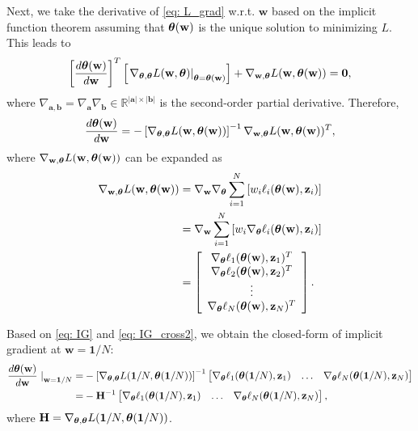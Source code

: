 Next, we take the derivative of  \eqref{eq: L_grad} w.r.t. $\mathbf w$ based on   the implicit function theorem \cite{gould2016differentiating} assuming that $\boldsymbol{\theta}(\mathbf w)$ is the  unique solution  to minimizing $L$. This leads to
\begin{equation}
     \left[\frac{d \boldsymbol{\theta}(\mathbf w)}{d \mathbf w}\right]^T \left[\left.\nabla_{\boldsymbol{\theta}, \boldsymbol{\theta}} L(\mathbf w, \boldsymbol{\theta})\right|_{\boldsymbol{\theta} = \boldsymbol{\theta}(\mathbf w)} \right] +  \nabla_{\mathbf w, \boldsymbol{\theta}}L(\mathbf w, \boldsymbol{\theta}(\mathbf w)) = \mathbf 0,
\end{equation}
where $\nabla_{\mathbf a, \mathbf b} = \nabla_{\mathbf a} \nabla_{\mathbf b} \in \mathbb R^{|\mathbf a| \times |\mathbf b|}$ is the second-order partial derivative. Therefore,
\begin{equation}
    \frac{d \boldsymbol{\theta}(\mathbf w)}{d \mathbf w} = -\left[\nabla_{\boldsymbol{\theta}, \boldsymbol{\theta}} L(\mathbf w, \boldsymbol{\theta}(\mathbf w))\right]^{-1} \nabla_{\mathbf w, \boldsymbol{\theta}}L(\mathbf w, \boldsymbol{\theta}(\mathbf w))^T,
    \label{eq: IG}
\end{equation}
where $\nabla_{\mathbf w, \boldsymbol{\theta}}L(\mathbf w, \boldsymbol{\theta}(\mathbf w))$ can be expanded as
\begin{align}
    \nabla_{\mathbf w, \boldsymbol{\theta}}L(\mathbf w, \boldsymbol{\theta}(\mathbf w)) & = \nabla_{\mathbf w} \nabla_{\boldsymbol{\theta}} \sum_{i = 1}^{N}\left[w_i \ell_i(\boldsymbol{\theta}(\mathbf w), \mathbf z_i)\right]   \\ &= \nabla_{\mathbf w} \sum_{i = 1}^{N}\left[w_i \nabla_{\boldsymbol{\theta}} \ell_i(\boldsymbol{\theta}(\mathbf w), \mathbf z_i)\right]   \\ &= \left[
    \begin{array}{c}
    \nabla_{\boldsymbol{\theta}} \ell_1(\boldsymbol{\theta}(\mathbf w), \mathbf z_1)^T \\
    \nabla_{\boldsymbol{\theta}} \ell_2(\boldsymbol{\theta}(\mathbf w), \mathbf z_2)^T \\
    \vdots \\
    \nabla_{\boldsymbol{\theta}} \ell_N(\boldsymbol{\theta}(\mathbf w), \mathbf z_N)^T
    \end{array}\right].
    \label{eq: IG_cross2}
\end{align}

Based on \eqref{eq: IG} and \eqref{eq: IG_cross2}, we obtain the closed-form of implicit gradient at $\mathbf w = \mathbf 1/N$:
\begin{align}
    \frac{d \boldsymbol{\theta}(\mathbf w)}{d \mathbf w} \left. \right|_{\mathbf w = \mathbf 1 / N} = & -\left[\nabla_{\boldsymbol{\theta}, \boldsymbol{\theta}} L(\mathbf 1/N, \boldsymbol{\theta}(\mathbf 1/N))\right]^{-1} 
    \begin{bmatrix}
    \nabla_{\boldsymbol{\theta}} \ell_1(\boldsymbol{\theta}(\mathbf 1/N), \mathbf z_1) & \ldots &
    \nabla_{\boldsymbol{\theta}} \ell_N(\boldsymbol{\theta}(\mathbf 1/N), \mathbf z_N)
    \end{bmatrix} \nonumber \\
    =  & - \mathbf H^{-1}  \begin{bmatrix}
    \nabla_{\boldsymbol{\theta}} \ell_1(\boldsymbol{\theta}(\mathbf 1/N), \mathbf z_1) & \ldots &
    \nabla_{\boldsymbol{\theta}} \ell_N(\boldsymbol{\theta}(\mathbf 1/N), \mathbf z_N)
    \end{bmatrix},
    \label{eq: IG_2}
\end{align}
where $\mathbf H = \nabla_{\boldsymbol{\theta}, \boldsymbol{\theta}} L(\mathbf 1/N, \boldsymbol{\theta}(\mathbf 1/N))$.

